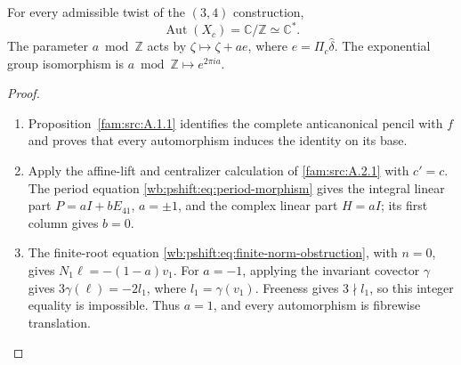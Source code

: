 \begin{theorem}\hypertarget{tag-01QF}{}\label{fam:src:B.4.1}\label{fam:st:B.4.1}\hypertarget{tag-02YQ}{}\label{night:P5.5}\label{stmt:P5.5}

For every admissible twist of the $(3,4)$ construction,
\[
 \operatorname{Aut}(X_c)=\mathbb C/\mathbb Z\simeq\mathbb C^*.
\]
The parameter $a\bmod\mathbb Z$ acts by $\zeta\mapsto\zeta+ae$,
where $e=\Pi_c\widehat\delta$. The exponential group isomorphism
is $a\bmod\mathbb Z\mapsto e^{2\pi ia}$.
\end{theorem}
\begin{proof}
\begin{enumerate}[label=\arabic*.,leftmargin=*]
\item Proposition~\ref{fam:src:A.1.1} identifies the complete
anticanonical pencil with $f$ and proves that every automorphism
induces the identity on its base.

\item Apply the affine-lift and centralizer calculation of
\cref{fam:src:A.2.1} with $c'=c$. The period equation
\eqref{wb:pshift:eq:period-morphism} gives the integral linear part
$P=aI+bE_{41}$, $a=\pm1$, and the complex linear part $H=aI$;
its first column gives $b=0$.

\item The finite-root equation
\eqref{wb:pshift:eq:finite-norm-obstruction}, with $n=0$,
gives $N_1\ell=-(1-a)v_1$. For $a=-1$, applying the invariant
covector $\gamma$ gives $3\gamma(\ell)=-2l_1$, where
$l_1=\gamma(v_1)$. Freeness gives $3\nmid l_1$, so this
integer equality is impossible. Thus $a=1$, and every
automorphism is fibrewise translation.


\end{enumerate}
\end{proof}
